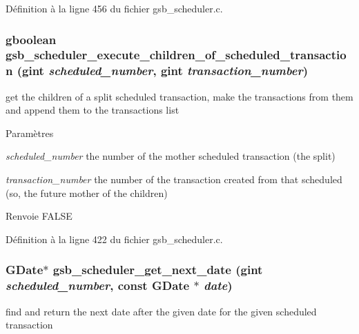 Définition à la ligne 456 du fichier gsb\_\-scheduler.c.

\subsubsection[{gsb\_\-scheduler\_\-execute\_\-children\_\-of\_\-scheduled\_\-transaction}]{\setlength{\rightskip}{0pt plus 5cm}gboolean gsb\_\-scheduler\_\-execute\_\-children\_\-of\_\-scheduled\_\-transaction (gint {\em scheduled\_\-number}, \/  gint {\em transaction\_\-number})}\label{gsb__scheduler_8h_abae75f35ff3f5218ffbf2444c0b8f8ed}
get the children of a split scheduled transaction, make the transactions from them and append them to the transactions list


\begin{DoxyParams}{Paramètres}
\item[{\em scheduled\_\-number}]the number of the mother scheduled transaction (the split) \item[{\em transaction\_\-number}]the number of the transaction created from that scheduled (so, the future mother of the children)\end{DoxyParams}
\begin{DoxyReturn}{Renvoie}
FALSE 
\end{DoxyReturn}


Définition à la ligne 422 du fichier gsb\_\-scheduler.c.

\subsubsection[{gsb\_\-scheduler\_\-get\_\-next\_\-date}]{\setlength{\rightskip}{0pt plus 5cm}GDate$\ast$ gsb\_\-scheduler\_\-get\_\-next\_\-date (gint {\em scheduled\_\-number}, \/  const GDate $\ast$ {\em date})}\label{gsb__scheduler_8h_ace6ee5adae18cc4bad4074296e8a5613}
find and return the next date after the given date for the given scheduled transaction


